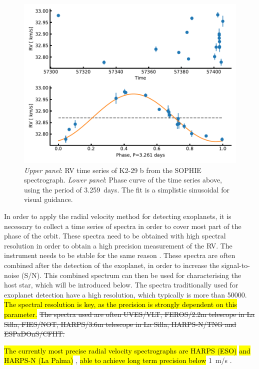 \begin{figure}[htpb!]
    \centering
    \includegraphics[width=1.0\linewidth]{figures/RVmethod.pdf}
    \caption{\emph{Upper panel}: RV time series of K2-29 b from the SOPHIE spectrograph.
             \emph{Lower panel}: Phase curve of the time series above, using the period of
             \SI{3.259}{days}. The fit is a simplistic sinusoidal for visual guidance.}
    \label{fig:rvmethod}
\end{figure}

In order to apply the radial velocity method for detecting exoplanets, it is necessary to collect a
time series of spectra in order to cover most part of the phase of the orbit. These spectra need to
be obtained with high spectral resolution in order to obtain a high precision measurement of the RV.
The instrument needs to be stable for the same reason \citep[see e.g.][]{Bouchy2001}. These spectra
are often combined after the detection of the exoplanet, in order to increase the signal-to-noise
(S/N). This combined spectrum can then be used for characterising the host star, which will be
introduced below. The spectra traditionally used for exoplanet detection have a high resolution,
which typically is more than \num{50000}. \hl{The spectral resolution is key, as the precision is
strongly dependent on this parameter.} \st{The spectra used are often UVES/VLT, FEROS/2.2m
telescope in La Silla, FIES/NOT, HARPS/3.6m telescope in La Silla, HARPS-N/TNG and ESPaDOnS/CFHT.}

\hl{The currently most precise radial velocity spectrographs are HARPS (ESO)} \citep{HARPS} \hl{and
HARPS-N (La Palma)} \citep{HARPSN}, \hl{able to achieve long term precision below} \SI{1}{m/s}
\citep[see e.g.][]{Pepe2013}.


